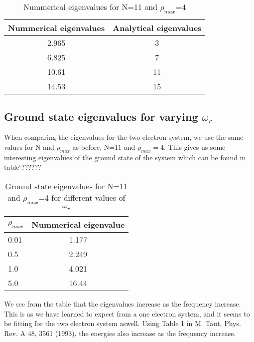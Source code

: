 \documentclass{article}
\begin{document}
\begin{table}[H]
    \centering
    \begin{tabular}{|c|c|}
    \hline
     Nummerical eigenvalues & Analytical eigenvalues\\
     \hline
      2.965  &  3\\
      6.825  &  7\\
      10.61  &  11\\
      14.53  &  15\\
     \hline
    \end{tabular}
    \caption{Nummerical eigenvalues for N=11 and $\rho_{max}$=4}
    \label{tab:my_label}
\end{table}

\subsection{Ground state eigenvalues for varying $\omega_r$}

When comparing the eigenvalues for the two-electron system, we use the same values for N and $\rho_{max}$ as before, N=11 and $\rho_{max}=4$. This gives us some interesting eigenvalues of the ground state of the system which can be found in table`??????

\begin{table}[H]
    \centering
    \begin{tabular}{|l|c|}
    \hline
    $\rho_{max}$ & Nummerical eigenvalue \\
    \hline
    0.01 & 1.177  \\
    0.5  & 2.249  \\
    1.0 & 4.021  \\
    5.0 &  16.44  \\
     \hline
    \end{tabular}
    \caption{Ground state eigenvalues for N=11 and $\rho_{max}$=4 for different values of $\omega_r$}
    \label{tab:my_label}
\end{table}

We see from the table that the eigenvalues increase as the frequency increase. This is as we have learned to expect from a one electron system, and it seems to be fitting for the two electron system aswell. Using Table 1 in M. Taut, Phys. Rev. A 48, 3561 (1993), the energies also increase as the frequency increase.
\end{document}
